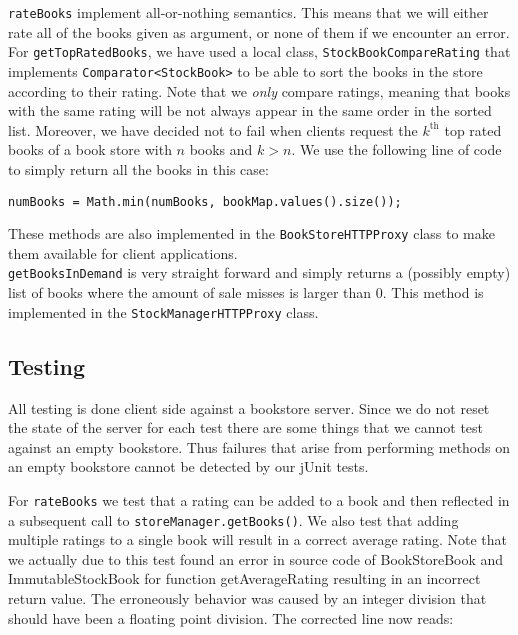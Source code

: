 \documentclass[11pt]{article}
\begin{document}
\texttt{rateBooks} implement all-or-nothing semantics. This means that we will
either rate all of the books given as argument, or none of them if we encounter
an error.
For \texttt{getTopRatedBooks}, we have used a local class,
\texttt{StockBookCompareRating} that implements \texttt{Comparator<StockBook>}
to be able to sort the books in the store according to their rating. Note that
we \emph{only} compare ratings, meaning that books with the same rating will be
not always appear in the same order in the sorted list.
Moreover, we have decided not to fail when clients request the $k^{\text{th}}$
top rated books of a book store with $n$ books and $k>n$. We use the following
line of code to simply return all the books in this case:

\begin{center}
\texttt{numBooks = Math.min(numBooks, bookMap.values().size());}
\end{center}

These methods are also implemented in the \texttt{BookStoreHTTPProxy} class to
make them available for client applications.\\

\texttt{getBooksInDemand} is very straight forward and simply returns a
(possibly empty) list of books where the amount of sale misses is larger than
0. This method is implemented in the \texttt{StockManagerHTTPProxy} class.

\subsection*{Testing}

All testing is done client side against a bookstore server. Since we do not reset the state of the server for each test there are some things that we cannot test against an empty bookstore. Thus failures that arise from performing methods on an empty bookstore cannot be detected by our jUnit tests.

For \texttt{rateBooks} we test that a rating can be added to a book and then reflected in a subsequent call to \texttt{storeManager.getBooks()}. We also test that adding multiple ratings to a single book will result in a correct average rating. Note that we actually due to this test found an error in source code of BookStoreBook and ImmutableStockBook for function getAverageRating resulting in an incorrect return value. The erroneously behavior was caused by an integer division that should have been a floating point division. The corrected line now reads:
\end{document}
